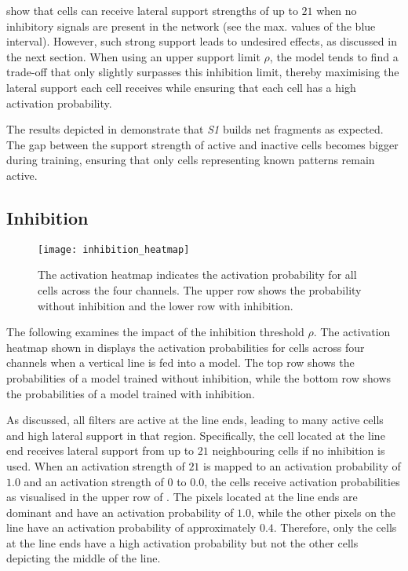  show that cells can receive lateral support strengths of up to $21$ when no inhibitory signals are present in the network (see the max. values of the blue interval).
However, such strong support leads to undesired effects, as discussed in the next section.
When using an upper support limit $\rho$, the model tends to find a trade-off that only slightly surpasses this inhibition limit, thereby maximising the lateral support each cell receives while ensuring that each cell has a high activation probability.

The results depicted in  demonstrate that \emph{S1} builds net fragments as expected. The gap between the support strength of active and inactive cells becomes bigger during training, ensuring that only cells representing known patterns remain active.

\subsection{Inhibition}
%
\begin{figure}[h]
    \centering
    \texttt{[image: inhibition\_heatmap]}
    \caption[Activation heatmap with/without inhibition]{The activation heatmap indicates the activation probability for all cells across the four channels. The upper row shows the probability without inhibition and the lower row with inhibition.}
\end{figure}
%
The following examines the impact of the inhibition threshold $\rho$. The activation heatmap shown in  displays the activation probabilities for cells across four channels when a vertical line is fed into a model.
The top row shows the probabilities of a model trained without inhibition, while the bottom row shows the probabilities of a model trained with inhibition.

As discussed, all filters are active at the line ends, leading to many active cells and high lateral support in that region.
Specifically, the cell located at the line end receives lateral support from up to $21$ neighbouring cells if no inhibition is used.
When an activation strength of $21$ is mapped to an activation probability of $1.0$ and an activation strength of $0$ to $0.0$, the cells receive activation probabilities as visualised in the upper row of .
The pixels located at the line ends are dominant and have an activation probability of $1.0$, while the other pixels on the line have an activation probability of approximately $0.4$.
Therefore, only the cells at the line ends have a high activation probability but not the other cells depicting the middle of the line.

